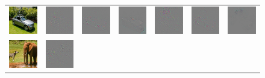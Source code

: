 \begin{figure}
\begin{center}
\begin{tabular}{c||ccc||ccc}
\includegraphics[width=0.13\linewidth]{figs/examples/googlenet/oxford/bic-car2} &
\includegraphics[width=0.13\linewidth]{figs/examples/googlenet/oxford/bic-car2_diff_818} &
\includegraphics[width=0.13\linewidth]{figs/examples/googlenet/deconv/bic-car2_diff_818} &
\includegraphics[width=0.13\linewidth]{figs/examples/googlenet/soft/bic-car2_diff_818} &
\includegraphics[width=0.13\linewidth]{figs/examples/googlenet/oxford/bic-car2_diff_672} &
\includegraphics[width=0.13\linewidth]{figs/examples/googlenet/deconv/bic-car2_diff_672} &
\includegraphics[width=0.13\linewidth]{figs/examples/googlenet/soft/bic-car2_diff_672} \\
\includegraphics[width=0.13\linewidth]{figs/examples/googlenet/oxford/zeb-ele1} &
\includegraphics[width=0.13\linewidth]{figs/examples/googlenet/oxford/zeb-ele1_diff_341} &

\end{tabular}
\end{center}
\end{figure}
